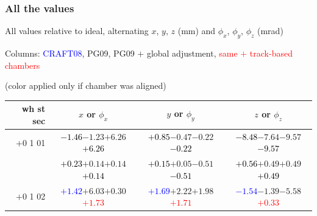 \documentclass[compress]{beamer}
\begin{document}
\begin{frame}
\frametitle{All the values}
\tiny

All values relative to ideal, alternating $x$, $y$, $z$ (mm) and $\phi_x$, $\phi_y$, $\phi_z$ (mrad)

Columns: \textcolor{blue}{CRAFT08}, PG09, PG09 $+$ global adjustment, \textcolor{red}{same $+$ track-based chambers}

\hfill (color applied only if chamber was aligned)

\vfill
\renewcommand{\arraystretch}{1.1}
\begin{tabular}{r | c | c | c}
wh st sec & $x$ or $\phi_x$ & $y$ or $\phi_y$ & $z$ or $\phi_z$ \\\hline
$+$0 1 01 & \textcolor{black}{$-1.46$}\hspace{0.1 cm}$-1.23$\hspace{0.1 cm}$+6.26$\hspace{0.1 cm}\textcolor{black}{$+6.26$} & \textcolor{black}{$+0.85$}\hspace{0.1 cm}$-0.47$\hspace{0.1 cm}$-0.22$\hspace{0.1 cm}\textcolor{black}{$-0.22$} & \textcolor{black}{$-8.48$}\hspace{0.1 cm}$-7.64$\hspace{0.1 cm}$-9.57$\hspace{0.1 cm}\textcolor{black}{$-9.57$} \\
          & \textcolor{black}{$+0.23$}\hspace{0.1 cm}$+0.14$\hspace{0.1 cm}$+0.14$\hspace{0.1 cm}\textcolor{black}{$+0.14$} & \textcolor{black}{$+0.15$}\hspace{0.1 cm}$+0.05$\hspace{0.1 cm}$-0.51$\hspace{0.1 cm}\textcolor{black}{$-0.51$} & \textcolor{black}{$+0.56$}\hspace{0.1 cm}$+0.49$\hspace{0.1 cm}$+0.49$\hspace{0.1 cm}\textcolor{black}{$+0.49$} \\
$+$0 1 02 & \textcolor{blue}{$+1.42$}\hspace{0.1 cm}$+6.03$\hspace{0.1 cm}$+0.30$\hspace{0.1 cm}\textcolor{red}{$+1.73$} & \textcolor{blue}{$+1.69$}\hspace{0.1 cm}$+2.22$\hspace{0.1 cm}$+1.98$\hspace{0.1 cm}\textcolor{red}{$+1.71$} & \textcolor{blue}{$-1.54$}\hspace{0.1 cm}$-1.39$\hspace{0.1 cm}$-5.58$\hspace{0.1 cm}\textcolor{red}{$+0.33$} \\

\end{tabular}
\end{frame}
\end{document}
